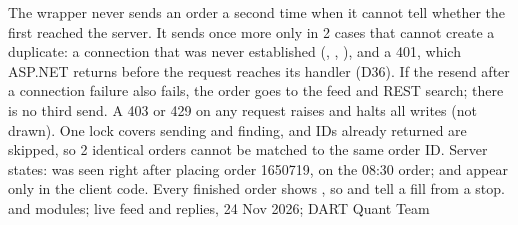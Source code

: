 {\begin{tikzpicture}
\end{tikzpicture}}{The wrapper never sends an order a second time when it cannot tell whether the first reached the server. It sends once more only in 2 cases that cannot create a duplicate: a connection that was never established (, , ), and a 401, which ASP.NET returns before the request reaches its handler (D36). If the resend after a connection failure also fails, the order goes to the feed and REST search; there is no third send. A 403 or 429 on any request raises  and halts all writes (not drawn). One lock covers sending and finding, and IDs already returned are skipped, so 2 identical orders cannot be matched to the same order ID. Server states:  was seen right after placing order 1650719,  on the 08:30 order;  and  appear only in the client code. Every finished order shows , so  and  tell a fill from a stop.}{  and  modules; live feed and  replies, 24 Nov 2026; DART Quant Team}

